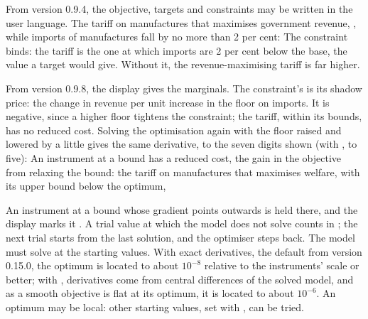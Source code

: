 
From version 0.9.4, the objective, targets and constraints may be written in
the user language. The tariff on manufactures that maximises government
revenue, , while imports of manufactures fall by no more than 2 per
cent:
The constraint binds: the tariff is the one at which imports are 2 per cent
below the base, the value a target 
would give. Without it, the revenue-maximising tariff is far higher.


From version 0.9.8, the display gives the marginals. The constraint's is its
shadow price: the change in revenue per unit increase in the floor on
imports. It is negative, since a higher floor tightens the constraint; the
tariff, within its bounds, has no reduced cost. Solving the optimisation again
with the floor raised and lowered by a little gives the same derivative, to
the seven digits shown (with , to five):
An instrument at a bound has a reduced cost, the gain in the objective from
relaxing the bound: the tariff on manufactures that maximises welfare, with
its upper bound below the optimum,


An instrument at a bound whose gradient points outwards is held there, and
the display marks it . A trial value at which the model
does not solve counts in ; the next trial starts from the
last solution, and the optimiser steps back. The model must solve at the
starting values. With exact derivatives, the default from version 0.15.0,
the optimum is located to about $10^{-8}$ relative to the instruments' scale
or better; with , derivatives come from central
differences of the solved model, and as a smooth objective is flat at its
optimum, it is located to about $10^{-6}$. An optimum may be local: other
starting values, set with , can be tried.


